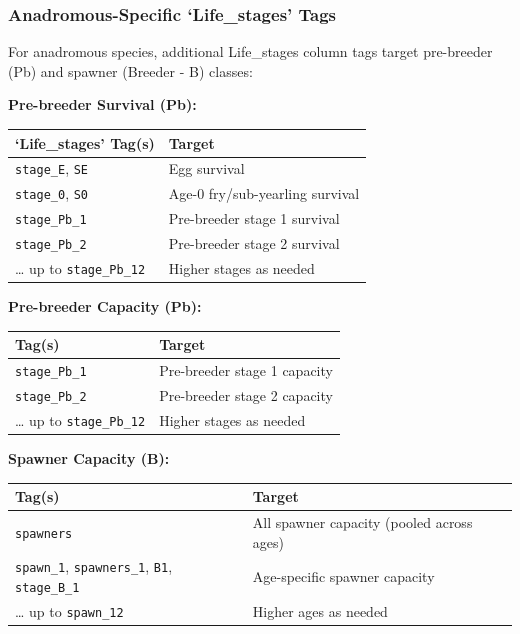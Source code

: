 \documentclass[
  letterpaper,
  DIV=11,
  numbers=noendperiod]{scrreprt}
\begin{document}
\subsubsection{\texorpdfstring{Anadromous-Specific
\textbf{`Life\_stages'}
Tags}{Anadromous-Specific `Life\_stages' Tags}}\label{anadromous-specific-life_stages-tags}

For anadromous species, additional Life\_stages column tags target
pre-breeder (Pb) and spawner (Breeder - B) classes:

\textbf{Pre-breeder Survival (Pb):}

\begin{longtable}[]{@{}ll@{}}
\toprule\noalign{}
\textbf{`Life\_stages'} Tag(s) & Target \\
\midrule\noalign{}
\endhead
\bottomrule\noalign{}
\endlastfoot
\texttt{stage\_E}, \texttt{SE} & Egg survival \\
\texttt{stage\_0}, \texttt{S0} & Age-0 fry/sub-yearling survival \\
\texttt{stage\_Pb\_1} & Pre-breeder stage 1 survival \\
\texttt{stage\_Pb\_2} & Pre-breeder stage 2 survival \\
\ldots{} up to \texttt{stage\_Pb\_12} & Higher stages as needed \\
\end{longtable}

\textbf{Pre-breeder Capacity (Pb):}

\begin{longtable}[]{@{}ll@{}}
\toprule\noalign{}
Tag(s) & Target \\
\midrule\noalign{}
\endhead
\bottomrule\noalign{}
\endlastfoot
\texttt{stage\_Pb\_1} & Pre-breeder stage 1 capacity \\
\texttt{stage\_Pb\_2} & Pre-breeder stage 2 capacity \\
\ldots{} up to \texttt{stage\_Pb\_12} & Higher stages as needed \\
\end{longtable}

\textbf{Spawner Capacity (B):}

\begin{longtable}[]{@{}
  >{\raggedright\arraybackslash}p{}
  >{\raggedright\arraybackslash}p{}@{}}
\toprule\noalign{}
\begin{minipage}[b]{\linewidth}\raggedright
Tag(s)
\end{minipage} & \begin{minipage}[b]{\linewidth}\raggedright
Target
\end{minipage} \\
\midrule\noalign{}
\endhead
\bottomrule\noalign{}
\endlastfoot
\texttt{spawners} & All spawner capacity (pooled across ages) \\
\texttt{spawn\_1}, \texttt{spawners\_1}, \texttt{B1},
\texttt{stage\_B\_1} & Age-specific spawner capacity \\
\ldots{} up to \texttt{spawn\_12} & Higher ages as needed \\
\end{longtable}
\end{document}
